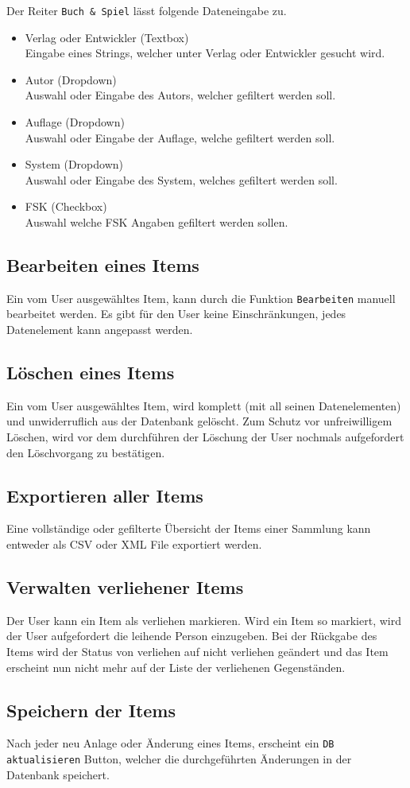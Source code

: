 Der Reiter {\color{IndianRed}\texttt{Buch \& Spiel}} lässt folgende Dateneingabe zu.

\begin{itemize}
	\item Verlag oder Entwickler (Textbox) \\
	Eingabe eines Strings, welcher unter Verlag oder Entwickler gesucht wird.
	\item Autor (Dropdown) \\
	Auswahl oder Eingabe des Autors, welcher gefiltert werden soll.
	\item Auflage (Dropdown) \\
	Auswahl oder Eingabe der Auflage, welche gefiltert werden soll.
	\item System (Dropdown) \\
	Auswahl oder Eingabe des System, welches gefiltert werden soll.
	\item FSK (Checkbox) \\
	Auswahl welche FSK Angaben gefiltert werden sollen.
\end{itemize}

\subsection{Bearbeiten eines Items}
Ein vom User ausgewähltes Item, kann durch die Funktion {\color{IndianRed}\texttt{Bearbeiten}} manuell bearbeitet werden. Es gibt für den User keine Einschränkungen, jedes Datenelement kann angepasst werden. 

\subsection{Löschen eines Items}
Ein vom User ausgewähltes Item, wird komplett (mit all seinen Datenelementen) und unwiderruflich aus der Datenbank gelöscht. Zum Schutz vor unfreiwilligem Löschen, wird vor dem durchführen der Löschung der User nochmals aufgefordert den Löschvorgang zu bestätigen.

\subsection{Exportieren aller Items}
Eine vollständige oder gefilterte Übersicht der Items einer Sammlung kann entweder als CSV oder XML File exportiert werden.

\subsection{Verwalten verliehener Items}
Der User kann ein Item als verliehen markieren. Wird ein Item so markiert, wird der User aufgefordert die leihende Person einzugeben. Bei der Rückgabe des Items wird der Status von verliehen auf nicht verliehen geändert und das Item erscheint nun nicht mehr auf der Liste der verliehenen Gegenständen.

\subsection{Speichern der Items} 
Nach jeder neu Anlage oder Änderung eines Items, erscheint ein {\color{IndianRed}\texttt{DB aktualisieren}} Button, welcher die durchgeführten Änderungen in der Datenbank speichert.